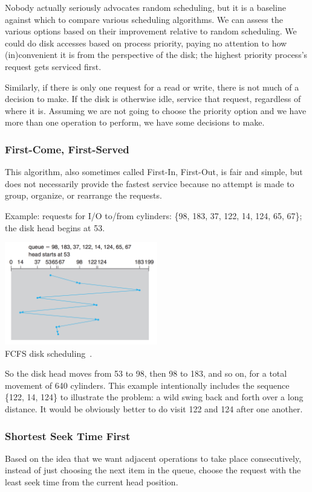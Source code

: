 Nobody actually seriously advocates random scheduling, but it is a baseline against which to compare various scheduling algorithms. We can assess the various options based on their improvement relative to random scheduling. We could do disk accesses based on process priority, paying no attention to how (in)convenient it is from the perspective of the disk; the highest priority process's request gets serviced first. 

Similarly, if there is only one request for a read or write, there is not much of a decision to make. If the disk is otherwise idle, service that request, regardless of where it is. Assuming we are not going to choose the priority option and we have more than one operation to perform, we have some decisions to make.

\subsubsection*{First-Come, First-Served}
This algorithm, also sometimes called First-In, First-Out, is fair and simple, but does not necessarily provide the fastest service because no attempt is made to group, organize, or rearrange the requests.

Example: requests for I/O to/from cylinders: \{98, 183, 37, 122, 14, 124, 65, 67\}; the disk head begins at 53.

\begin{center}
	\includegraphics[width=0.5\textwidth]{images/disk-fcfs.png}\\
	FCFS disk scheduling~\cite{osc}.
\end{center}

So the disk head moves from 53 to 98, then 98 to 183, and so on, for a total movement of 640 cylinders. This example intentionally includes the sequence \{122, 14, 124\} to illustrate the problem: a wild swing back and forth over a long distance. It would be obviously better to do visit 122 and 124 after one another. 

\subsubsection*{Shortest Seek Time First}
Based on the idea that we want adjacent operations to take place consecutively, instead of just choosing the next item in the queue, choose the request with the least seek time from the current head position.


